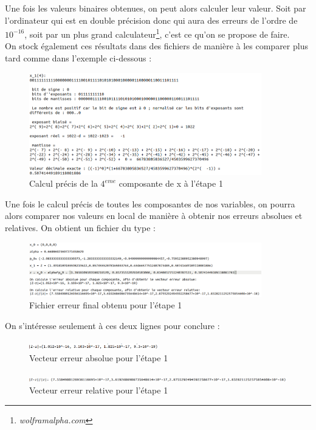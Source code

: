 \documentclass[12,french]{report}
\begin{document}
Une fois les valeurs binaires obtenues, on peut alors calculer leur valeur. Soit par l'ordinateur qui est en double précision donc qui aura des erreurs de l'ordre de $10^{-16}$, soit par un plus grand calculateur\footnote{\textit{wolframalpha.com}}, c'est ce qu'on se propose de faire.\\

On stock également ces résultats dans des fichiers de manière à les comparer plus tard comme dans l'exemple ci-dessous :

\begin{figure}[H]
	\center
	\includegraphics[width=0.9\textwidth]{./Images/x_1(4)}
	\caption{Calcul précis de la $4^{eme}$ composante de x à l'étape 1}
\end{figure}

Une fois le calcul précis de toutes les composantes de nos variables, on pourra alors comparer nos valeurs en local de manière à obtenir nos erreurs absolues et relatives. On obtient un fichier du type :

\begin{figure}[H]
	\center
	\includegraphics[width=0.9\textwidth]{./Images/err_x_1}
	\caption{Fichier erreur final obtenu pour l'étape 1}
\end{figure}

On s'intéresse seulement à ces deux lignes pour conclure :
\begin{figure}[H]
	\center
	\includegraphics[width=0.5\textwidth]{./Images/err_abs_x_1}
	\caption{Vecteur erreur absolue pour l'étape 1}
\end{figure}
\begin{figure}[H]
	\center
	\includegraphics[width=1\textwidth]{./Images/err_rel_x_1}
	\caption{Vecteur erreur relative pour l'étape 1}
\end{figure}
\end{document}
